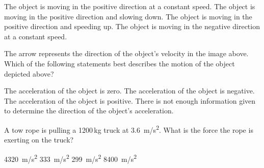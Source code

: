 \documentclass[answers]{exam}
\begin{document}
\begin{questions}
\begin{randomizechoices}
    \choice The object is moving in the positive direction at a constant speed.
    \correctchoice The object is moving in the positive direction and slowing down.
    \choice The object is moving in the positive direction and speeding up.
    \choice The object is moving in the negative direction at a constant speed.  
\end{randomizechoices}


\question
\phantom{.}

\begin{center}
\end{center}

The arrow represents the direction of the object's velocity in the image above. Which of the following statements best describes the motion of the object depicted above?

\begin{randomizechoices}
    \choice The acceleration of the object is zero.
    \choice The acceleration of the object is negative.
    \correctchoice The acceleration of the object is positive.
    \choice There is not enough information given to determine the direction of the object’s acceleration.
\end{randomizechoices}


\question
A tow rope is pulling a 1200\,kg truck at \SI{3.6}{m/s^2}. What is the force the rope is exerting on the truck?

\begin{randomizeoneparchoices}
    \correctchoice \SI{4320}{m/s^2}
    \choice \SI{333}{m/s^2}
    \choice \SI{299}{m/s^2}
    \choice \SI{8400}{m/s^2}
\end{randomizeoneparchoices}



\end{questions}
\end{document}
